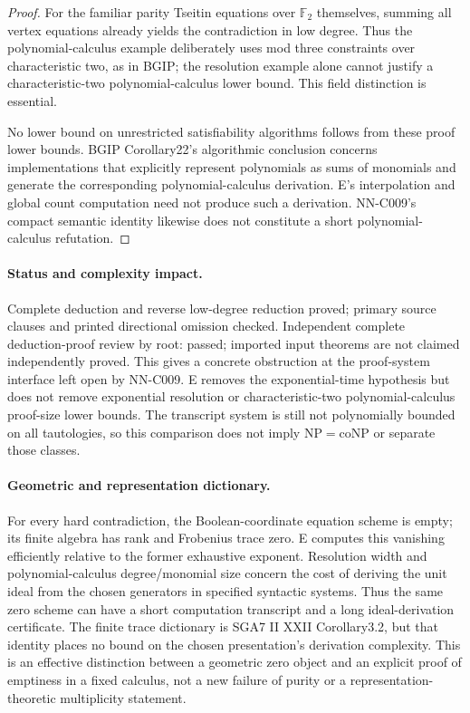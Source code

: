\begin{proof}
For the familiar parity Tseitin equations over $\mathbb F_2$ themselves, summing all vertex equations already yields the contradiction in low degree. Thus the polynomial-calculus example deliberately uses mod three constraints over characteristic two, as in BGIP; the resolution example alone cannot justify a characteristic-two polynomial-calculus lower bound. This field distinction is essential.

No lower bound on unrestricted satisfiability algorithms follows from these proof lower bounds. BGIP Corollary22's algorithmic conclusion concerns implementations that explicitly represent polynomials as sums of monomials and generate the corresponding polynomial-calculus derivation. E's interpolation and global count computation need not produce such a derivation. NN-C009's compact semantic identity likewise does not constitute a short polynomial-calculus refutation.
\end{proof}
\paragraph{Status and complexity impact.}
Complete deduction and reverse low-degree reduction proved; primary source clauses and printed directional omission checked. Independent complete deduction-proof review by root: passed; imported input theorems are not claimed independently proved. This gives a concrete obstruction at the proof-system interface left open by NN-C009. E removes the exponential-time hypothesis but does not remove exponential resolution or characteristic-two polynomial-calculus proof-size lower bounds. The transcript system is still not polynomially bounded on all tautologies, so this comparison does not imply $\mathrm{NP}=\mathrm{coNP}$ or separate those classes.

\paragraph{Geometric and representation dictionary.}
For every hard contradiction, the Boolean-coordinate equation scheme is empty; its finite algebra has rank and Frobenius trace zero. E computes this vanishing efficiently relative to the former exhaustive exponent. Resolution width and polynomial-calculus degree/monomial size concern the cost of deriving the unit ideal from the chosen generators in specified syntactic systems. Thus the same zero scheme can have a short computation transcript and a long ideal-derivation certificate. The finite trace dictionary is SGA7 II XXII Corollary3.2, but that identity places no bound on the chosen presentation's derivation complexity. This is an effective distinction between a geometric zero object and an explicit proof of emptiness in a fixed calculus, not a new failure of purity or a representation-theoretic multiplicity statement.



